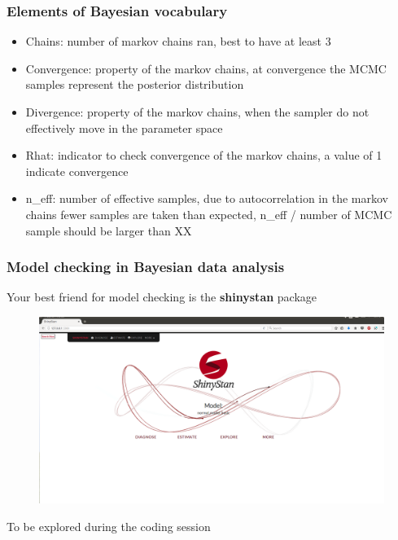 \documentclass{beamer}
\begin{document}
   
  \begin{frame}
  \frametitle{\bf Elements of Bayesian vocabulary}
  
   \begin{itemize}
   \item Chains: number of markov chains ran, best to have at least 3
   \item Convergence: property of the markov chains, at convergence the MCMC samples represent the posterior distribution
   \item Divergence: property of the markov chains, when the sampler do not effectively move in the parameter space
   \item Rhat: indicator to check convergence of the markov chains, a value of 1 indicate convergence
   \item n\_eff: number of effective samples, due to autocorrelation in the markov chains fewer samples are taken than expected, n\_eff / number of MCMC sample should be larger than XX
  \end{itemize}

  
 \end{frame}
 
  \begin{frame}
  \frametitle{\bf Model checking in Bayesian data analysis}
  
  Your best friend for model checking is the \textbf{shinystan} package
  
  \begin{figure}
   \includegraphics[width=\textwidth,height=.7\textheight,keepaspectratio]{shiny.png}
  \end{figure}
  
  To be explored during the coding session

  
 \end{frame}
 
\end{document}
